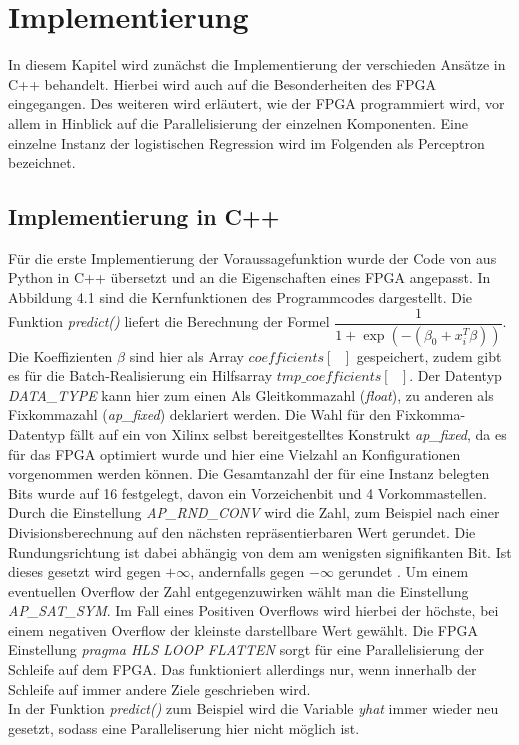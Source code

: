 \chapter{Implementierung}
In diesem Kapitel wird zunächst die Implementierung der verschieden Ansätze in C++ behandelt. Hierbei wird auch auf die Besonderheiten des FPGA eingegangen. Des weiteren wird erläutert, wie der FPGA programmiert wird, vor allem in Hinblick auf die Parallelisierung der einzelnen Komponenten. Eine einzelne Instanz der logistischen Regression wird im Folgenden als Perceptron bezeichnet.
\section{Implementierung in C++}
Für die erste Implementierung der Voraussagefunktion wurde der Code von \cite{IMPL} aus Python in C++ übersetzt und an die Eigenschaften eines FPGA angepasst. In Abbildung 4.1 sind die Kernfunktionen des Programmcodes dargestellt. Die Funktion \textit{predict()} liefert die Berechnung der Formel $\dfrac{1}{1+\exp(-(\beta_0+x_i^T\beta))}$. Die Koeffizienten $\beta$ sind hier als Array $coefficients[\text{ }]$ gespeichert, zudem gibt es für die Batch-Realisierung ein Hilfsarray $tmp\textit{\_}coefficients[\text{ }]$. Der Datentyp \textit{DATA\_TYPE} kann hier zum einen Als Gleitkommazahl (\textit{float}), zu anderen als Fixkommazahl (\textit{ap\_fixed}) deklariert werden. Die Wahl für den Fixkomma-Datentyp fällt auf ein von Xilinx selbst bereitgestelltes Konstrukt \textit{ap\_fixed}, da es für das FPGA optimiert wurde und hier eine Vielzahl an Konfigurationen vorgenommen werden können. Die Gesamtanzahl der für eine Instanz belegten Bits wurde auf 16 festgelegt, davon ein Vorzeichenbit und 4 Vorkommastellen. Durch die Einstellung \textit{AP\_RND\_CONV} wird die Zahl, zum Beispiel nach einer Divisionsberechnung auf den nächsten repräsentierbaren Wert gerundet. Die Rundungsrichtung ist dabei abhängig von dem am wenigsten signifikanten Bit. Ist dieses gesetzt wird gegen $+\infty$, andernfalls gegen $-\infty$ gerundet \cite{XIL2}.
Um einem eventuellen Overflow der Zahl entgegenzuwirken wählt man die Einstellung \textit{AP\_SAT\_SYM}. Im Fall eines Positiven Overflows wird hierbei der höchste, bei einem negativen Overflow der kleinste darstellbare Wert gewählt.\cite{XIL2} Die FPGA Einstellung \textit{pragma HLS LOOP FLATTEN} sorgt für eine Parallelisierung der Schleife auf dem FPGA. Das funktioniert allerdings nur, wenn innerhalb der Schleife auf immer andere Ziele geschrieben wird.\\ In der Funktion \textit{predict()} zum Beispiel wird die Variable \textit{yhat} immer wieder neu gesetzt, sodass eine Paralleliserung hier nicht möglich ist. 
